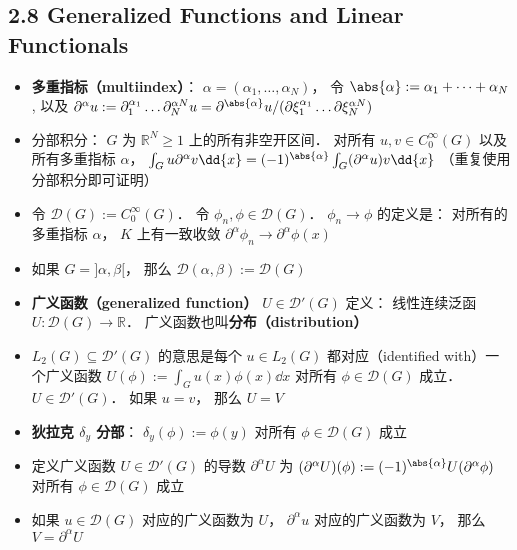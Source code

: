 \subsection{2.8 Generalized Functions and Linear Functionals}
\begin{itemize}
\item \textbf{多重指标（multiindex）}： $\alpha = (\alpha_1, \dots, \alpha_N)$， 令 $\abs{\alpha} := \alpha_1 + \dots + \alpha_N$, 以及 $\partial^\alpha u := \partial_1^{\alpha_1} \dots \partial_N^{\alpha N} u = \partial^{\abs{\alpha}} u/ (\partial\xi_1^{\alpha_1} \dots \partial\xi_N^{\alpha N})$

\item 分部积分： $G$ 为 $\mathbb R^N \ge 1$ 上的所有非空开区间． 对所有 $u, v \in C_0^\infty(G)$ 以及所有多重指标 $\alpha$， $\int_G u\partial^\alpha v \dd{x} = (-1)^{\abs{\alpha}} \int_G (\partial^\alpha u)v \dd{x}$ （重复使用分部积分即可证明）

\item 令 $\mathcal D(G) := C_0^\infty(G)$． 令 $\phi_n, \phi \in \mathcal D(G)$． $\phi_n \to \phi$ 的定义是： 对所有的多重指标 $\alpha$， $K$ 上有一致收敛 $\partial^\alpha \phi_n \to \partial^\alpha \phi(x)$

\item 如果 $G = ]\alpha,\beta[$， 那么 $\mathcal D(\alpha,\beta) := \mathcal D(G)$

\item \textbf{广义函数（generalized function）} $U \in \mathcal D'(G)$ 定义： 线性连续泛函 $U: \mathcal D(G) \to \mathbb R$． 广义函数也叫\textbf{分布（distribution）}

\item $L_2(G) \subseteq \mathcal D'(G)$ 的意思是每个 $u\in L_2(G)$ 都对应（identified with）一个广义函数 $U(\phi) := \int_G u(x) \phi(x) \dd{x}$ 对所有 $\phi \in \mathcal D(G)$ 成立． $U \in \mathcal D'(G)$． 如果 $u = v$， 那么 $U = V$

\item \textbf{狄拉克 $\delta_y$ 分部}： $\delta_y(\phi) := \phi(y)$ 对所有 $\phi\in\mathcal D(G)$ 成立

\item 定义广义函数 $U \in \mathcal D'(G)$ 的导数 $\partial^\alpha U$ 为 $(\partial^\alpha U)(\phi) := (-1)^{\abs{\alpha}} U(\partial^\alpha \phi)$ 对所有 $\phi\in\mathcal D(G)$ 成立

\item 如果 $u \in\mathcal D(G)$ 对应的广义函数为 $U$， $\partial^\alpha u$ 对应的广义函数为 $V$， 那么 $V = \partial^\alpha U$


\end{itemize}
